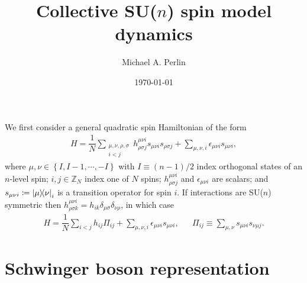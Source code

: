 \documentclass[nofootinbib,notitlepage,11pt]{revtex4-2}
\newcommand{\f}[2]{\dfrac{#1}{#2}} %
\newcommand{\p}[1]{\left(#1\right)} %
\renewcommand{\set}[1]{\left\{#1\right\}} %
\renewcommand{\i}{\mathrm{i}\mkern1mu} %
\newcommand{\1}{\mathds{1}}
\newcommand{\ZZ}{\mathbb{Z}}
\begin{document}
\thispagestyle{fancy}


\title{Collective SU($n$) spin model dynamics}%
\author{Michael A. Perlin}%
\date{\today}

\maketitle

We first consider a general quadratic spin Hamiltonian of the form
\begin{align}
  H = \f1N \sum_{\substack{\mu,\nu,\rho,\sigma\\i<j}}
  h^{\mu\nu i}_{\rho\sigma j} s_{\mu\nu i} s_{\rho\sigma j}
  + \sum_{\mu,\nu,i} \epsilon_{\mu\nu i} s_{\mu\nu i},
  \label{eq:spin}
\end{align}
where $\mu,\nu\in\set{I,I-1,\cdots,-I}$ with $I\equiv\p{n-1}/2$ index orthogonal states of an $n$-level spin; $i,j\in\ZZ_N$ index one of $N$ spins; $h^{\mu\nu i}_{\rho\sigma j}$ and $\epsilon_{\mu\nu i}$ are scalars; and $s_{\mu\nu i}\coloneqq\op{\mu}{\nu}_i$ is a transition operator for spin $i$.
If interactions are SU($n$) symmetric then $h^{\mu\nu i}_{\rho\sigma k} = h_{ik} \delta_{\mu\sigma}\delta_{\nu\rho}$, in which case
\begin{align}
  H = \f1N \sum_{i<j}
  h_{ij} \Pi_{ij}
  + \sum_{\mu,\nu,i} \epsilon_{\mu\nu i} s_{\mu\nu i},
  &&
  \Pi_{ij} \equiv \sum_{\mu,\nu} s_{\mu\nu i} s_{\nu\mu j}.
  \label{eq:spin_sun}
\end{align}

\section{Schwinger boson representation}
\end{document}
